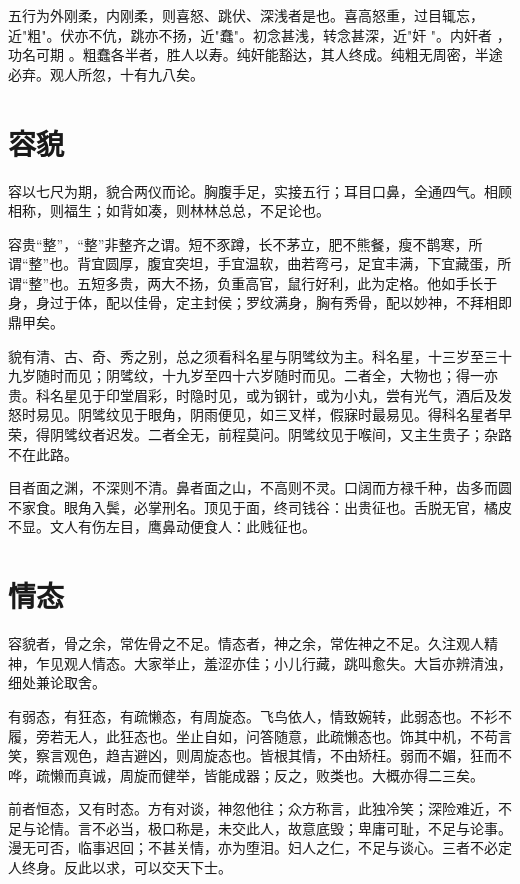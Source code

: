 \documentclass[12pt,UTF8]{ctexbook}
\begin{document}
五行为外刚柔，内刚柔，则喜怒、跳伏、深浅者是也。喜高怒重，过目辄忘，近"粗"。伏亦不伉，跳亦不扬，近"蠢"。初念甚浅，转念甚深，近"奸 "。内奸者 ，功名可期 。粗蠢各半者，胜人以寿。纯奸能豁达，其人终成。纯粗无周密，半途必弃。观人所忽，十有九八矣。 

\chapter{容貌}

容以七尺为期，貌合两仪而论。胸腹手足，实接五行；耳目口鼻，全通四气。相顾相称，则福生；如背如凑，则林林总总，不足论也。 

容贵“整”，“整”非整齐之谓。短不豕蹲，长不茅立，肥不熊餐，瘦不鹊寒，所谓“整”也。背宜圆厚，腹宜突坦，手宜温软，曲若弯弓，足宜丰满，下宜藏蛋，所谓“整”也。五短多贵，两大不扬，负重高官，鼠行好利，此为定格。他如手长于身，身过于体，配以佳骨，定主封侯；罗纹满身，胸有秀骨，配以妙神，不拜相即鼎甲矣。

貌有清、古、奇、秀之别，总之须看科名星与阴骘纹为主。科名星，十三岁至三十九岁随时而见；阴骘纹，十九岁至四十六岁随时而见。二者全，大物也；得一亦贵。科名星见于印堂眉彩，时隐时见，或为钢针，或为小丸，尝有光气，酒后及发怒时易见。阴骘纹见于眼角，阴雨便见，如三叉样，假寐时最易见。得科名星者早荣，得阴骘纹者迟发。二者全无，前程莫问。阴骘纹见于喉间，又主生贵子；杂路不在此路。 

目者面之渊，不深则不清。鼻者面之山，不高则不灵。口阔而方禄千种，齿多而圆不家食。眼角入鬓，必掌刑名。顶见于面，终司钱谷：出贵征也。舌脱无官，橘皮不显。文人有伤左目，鹰鼻动便食人：此贱征也。

\chapter{情态}

容貌者，骨之余，常佐骨之不足。情态者，神之余，常佐神之不足。久注观人精神，乍见观人情态。大家举止，羞涩亦佳；小儿行藏，跳叫愈失。大旨亦辨清浊，细处兼论取舍。 

有弱态，有狂态，有疏懒态，有周旋态。飞鸟依人，情致婉转，此弱态也。不衫不履，旁若无人，此狂态也。坐止自如，问答随意，此疏懒态也。饰其中机，不苟言笑，察言观色，趋吉避凶，则周旋态也。皆根其情，不由矫枉。弱而不媚，狂而不哗，疏懒而真诚，周旋而健举，皆能成器；反之，败类也。大概亦得二三矣。 

前者恒态，又有时态。方有对谈，神忽他往；众方称言，此独冷笑；深险难近，不足与论情。言不必当，极口称是，未交此人，故意底毁；卑庸可耻，不足与论事。漫无可否，临事迟回；不甚关情，亦为堕泪。妇人之仁，不足与谈心。三者不必定人终身。反此以求，可以交天下士。 
\end{document}
